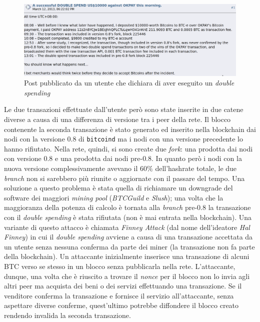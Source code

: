 \begin{figure}[H]
    \centering
    \includegraphics[width=\textwidth]{images/double_spending_post.png}
    \caption{Post pubblicato da un utente che dichiara di aver eseguito un \textit{double spending}}
\end{figure}
Le due transazioni effettuate dall'utente però sono state inserite in due catene diverse a causa di una differenza di versione tra i peer della rete. Il blocco contenente la seconda transazione è stato generato ed inserito nella blockchain dai nodi con la versione $0.8$ di \texttt{bitcoind} ma i nodi con una versione precedente lo hanno rifiutato. Nella rete, quindi, si sono create due \textit{fork}: una prodotta dai nodi con versione $0.8$ e una prodotta dai nodi pre-$0.8$. In quanto però i nodi con la nuova versione complessivamente avevano il $60\%$ dell'hashrate totale, le due \textit{branch} non si sarebbero più riunite o aggiornate con il passare del tempo. Una soluzione a questo problema è stata quella di richiamare un downgrade del software dei maggiori \textit{mining pool} (\textit{BTCGuild} e \textit{Slush}); una volta che la maggioranza della potenza di calcolo è tornata alla \textit{branch} pre-$0.8$ la transazione con il \textit{double spending} è stata rifiutata (non è mai entrata nella blockchain).
Una variante di questo attacco è chiamata \textit{Finney Attack} (dal nome dell'ideatore \textit{Hal Finney}) in cui il \textit{double spending} avviene a causa di una transazione accettata da un utente senza nessuna conferma da parte dei miner (la transazione non fa parte della blockchain). Un attaccante inizialmente inserisce una transazione di alcuni BTC verso se stesso in un blocco senza pubblicarla nella rete. L'attaccante, dunque, una volta che è riuscito a trovare il \textit{nonce} per il blocco non lo invia agli altri peer ma acquista dei beni o dei servizi effettuando una transazione. Se il venditore conferma la transazione e fornisce il servizio all'attaccante, senza aspettare diverse conferme, quest'ultimo potrebbe diffondere il blocco creato rendendo invalida la seconda transazione.

